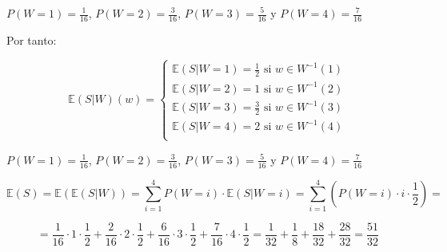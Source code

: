 \begin{problem}[4]
$P(W=1)=\frac{1}{16}$, $P(W=2)=\frac{3}{16}$, $P(W=3)=\frac{5}{16}$ y $P(W=4)=\frac{7}{16}$

Por tanto:

$$
\mathbb{E}(S|W)(w) =
  \left\lbrace
  \begin{array}{l}
     \mathbb{E}(S|W=1) = \frac{1}{2} \text{ si } w \in W^{-1}(1) \\
     \mathbb{E}(S|W=2) = 1 \text{ si } w \in W^{-1}(2) \\
     \mathbb{E}(S|W=3) = \frac{3}{2} \text{ si } w \in W^{-1}(3) \\
     \mathbb{E}(S|W=4) = 2 \text{ si } w \in W^{-1}(4) \\
  \end{array}
  \right.
$$









\spart
$P(W=1)=\frac{1}{16}$, $P(W=2)=\frac{3}{16}$, $P(W=3)=\frac{5}{16}$ y $P(W=4)=\frac{7}{16}$


\[
\mathbb{E}(S)=\mathbb{E}(\mathbb{E}(S|W))=\sum_{i=1}^{4}P(W=i)\cdot\mathbb{E}(S|W=i)=\sum_{i=1}^{4}\left( P(W=i)\cdot i \cdot \frac{1}{2}\right)= 
\]

\[
=\frac{1}{16}\cdot1\cdot\frac{1}{2}+\frac{2}{16}\cdot2\cdot\frac{1}{2}+\frac{6}{16}\cdot3\cdot\frac{1}{2}+\frac{7}{16}\cdot4\cdot\frac{1}{2}=\frac{1}{32}+\frac{1}{8}+\frac{18}{32}+\frac{28}{32}=\frac{51}{32}
\]
\end{problem}

